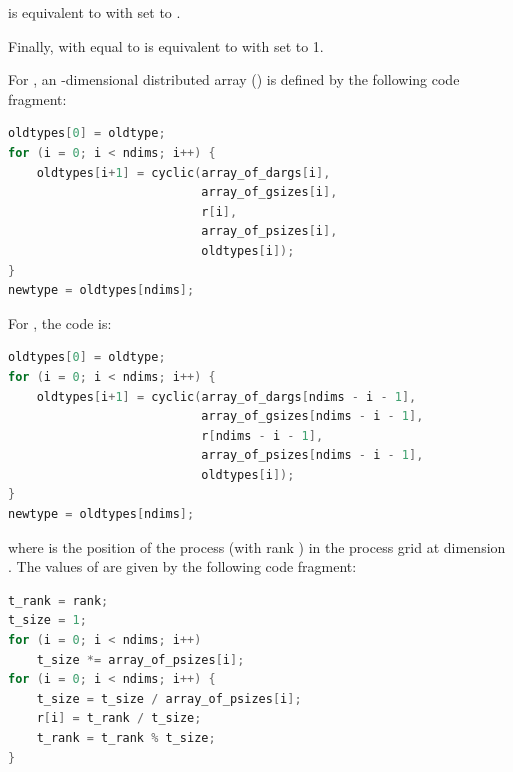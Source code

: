  is equivalent to
with  set to .

Finally,
 with
 equal to 
is equivalent to
 with
 set to 1.

For ,
an -dimensional distributed array ()
is defined by the following code fragment:

\begin{lstlisting}[language=C]
oldtypes[0] = oldtype;
for (i = 0; i < ndims; i++) {
    oldtypes[i+1] = cyclic(array_of_dargs[i],
                           array_of_gsizes[i],
                           r[i],
                           array_of_psizes[i],
                           oldtypes[i]);
}
newtype = oldtypes[ndims];
\end{lstlisting}

For , the code is:

\begin{lstlisting}[language=C]
oldtypes[0] = oldtype;
for (i = 0; i < ndims; i++) {
    oldtypes[i+1] = cyclic(array_of_dargs[ndims - i - 1],
                           array_of_gsizes[ndims - i - 1],
                           r[ndims - i - 1],
                           array_of_psizes[ndims - i - 1],
                           oldtypes[i]);
}
newtype = oldtypes[ndims];
\end{lstlisting}
where  is the position of the process (with rank )
in the process grid at dimension .
The values of  are given by the following code fragment:

\begin{lstlisting}[language=C]
t_rank = rank;
t_size = 1;
for (i = 0; i < ndims; i++)
    t_size *= array_of_psizes[i];
for (i = 0; i < ndims; i++) {
    t_size = t_size / array_of_psizes[i];
    r[i] = t_rank / t_size;
    t_rank = t_rank % t_size;
}
\end{lstlisting}


